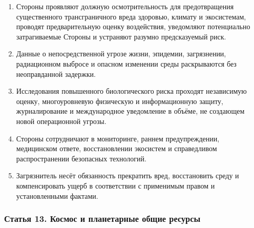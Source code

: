 \documentclass[
  russian,
  11pt,
  a4paper,
]{article}
\providecommand{\tightlist}{%
  \setlength{\itemsep}{0pt}\setlength{\parskip}{0pt}}
\begin{document}
\begin{enumerate}
\def\labelenumi{\arabic{enumi}.}
\tightlist
\item
  Стороны проявляют должную осмотрительность для предотвращения
  существенного трансграничного вреда здоровью, климату и экосистемам,
  проводят предварительную оценку воздействия, уведомляют потенциально
  затрагиваемые Стороны и устраняют разумно предсказуемый риск.
\item
  Данные о непосредственной угрозе жизни, эпидемии, загрязнении,
  радиационном выбросе и опасном изменении среды раскрываются без
  неоправданной задержки.
\item
  Исследования повышенного биологического риска проходят независимую
  оценку, многоуровневую физическую и информационную защиту,
  журналирование и международное уведомление в объёме, не создающем
  новой операционной угрозы.
\item
  Стороны сотрудничают в мониторинге, раннем предупреждении, медицинском
  ответе, восстановлении экосистем и справедливом распространении
  безопасных технологий.
\item
  Загрязнитель несёт обязанность прекратить вред, восстановить среду и
  компенсировать ущерб в соответствии с применимым правом и
  установленными фактами.
\end{enumerate}

\subsubsection{Статья 13. Космос и планетарные общие
ресурсы}\label{ux441ux442ux430ux442ux44cux44f-13-ux43aux43eux441ux43cux43eux441-ux438-ux43fux43bux430ux43dux435ux442ux430ux440ux43dux44bux435-ux43eux431ux449ux438ux435-ux440ux435ux441ux443ux440ux441ux44b}
\end{document}
